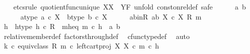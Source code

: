 \begin{isabellebody}
\ \ \isamarkupfalse%
\ {\isacharparenleft}{\kern0pt}etcs{\isacharunderscore}{\kern0pt}rule\ quotient{\isacharunderscore}{\kern0pt}func{\isacharunderscore}{\kern0pt}unique{\isacharbrackleft}{\kern0pt}\ X{\isacharequal}{\kern0pt}X{\isacharcomma}{\kern0pt}\ \ Y{\isacharequal}{\kern0pt}F{\isacharbrackright}{\kern0pt}{\isacharcomma}{\kern0pt}\ unfold\ const{\isacharunderscore}{\kern0pt}on{\isacharunderscore}{\kern0pt}rel{\isacharunderscore}{\kern0pt}def{\isacharcomma}{\kern0pt}\ safe{\isacharparenright}{\kern0pt}\isanewline
\ \ \ \ \isamarkupfalse%
\ a\ b\isanewline
\ \ \ \ \isamarkupfalse%
\ a{\isacharunderscore}{\kern0pt}type{\isacharcolon}{\kern0pt}\ {\isachardoublequoteopen}a\ {\isasymin}\isactrlsub c\ X{\isachardoublequoteclose}\ \ b{\isacharunderscore}{\kern0pt}type{\isacharcolon}{\kern0pt}\ {\isachardoublequoteopen}b\ {\isasymin}\isactrlsub c\ X{\isachardoublequoteclose}\isanewline
\ \ \ \ \isamarkupfalse%
\ ab{\isacharunderscore}{\kern0pt}in{\isacharunderscore}{\kern0pt}R{\isacharcolon}{\kern0pt}\ {\isachardoublequoteopen}{\isasymlangle}a{\isacharcomma}{\kern0pt}b{\isasymrangle}\ {\isasymin}\isactrlbsub X\ {\isasymtimes}\isactrlsub c\ X\isactrlesub \ {\isacharparenleft}{\kern0pt}R{\isacharcomma}{\kern0pt}\ m{\isacharparenright}{\kern0pt}{\isachardoublequoteclose}\isanewline
\ \ \ \ \isamarkupfalse%
\ \isamarkupfalse%
\ h\ \ h{\isacharunderscore}{\kern0pt}type{\isacharcolon}{\kern0pt}\ {\isachardoublequoteopen}h\ {\isasymin}\isactrlsub c\ R{\isachardoublequoteclose}\ \ m{\isacharunderscore}{\kern0pt}h{\isacharunderscore}{\kern0pt}eq{\isacharcolon}{\kern0pt}\ {\isachardoublequoteopen}m\ {\isasymcirc}\isactrlsub c\ h\ {\isacharequal}{\kern0pt}\ {\isasymlangle}a{\isacharcomma}{\kern0pt}\ b{\isasymrangle}{\isachardoublequoteclose}\isanewline
\ \ \ \ \ \ \isamarkupfalse%
\ relative{\isacharunderscore}{\kern0pt}member{\isacharunderscore}{\kern0pt}def\ factors{\isacharunderscore}{\kern0pt}through{\isacharunderscore}{\kern0pt}def\ \isamarkupfalse%
\ cfunc{\isacharunderscore}{\kern0pt}type{\isacharunderscore}{\kern0pt}def\ \isamarkupfalse%
\ auto\ \isanewline
\ \ \ \ \isanewline
\ \ \ \ \isamarkupfalse%
\ {\isachardoublequoteopen}{\isacharparenleft}{\kern0pt}k\ {\isasymcirc}\isactrlsub c\ equiv{\isacharunderscore}{\kern0pt}class\ {\isacharparenleft}{\kern0pt}R{\isacharcomma}{\kern0pt}\ m{\isacharparenright}{\kern0pt}{\isacharparenright}{\kern0pt}\ {\isasymcirc}\isactrlsub c\ left{\isacharunderscore}{\kern0pt}cart{\isacharunderscore}{\kern0pt}proj\ X\ X\ {\isasymcirc}\isactrlsub c\ m\ {\isasymcirc}\isactrlsub c\ h\ {\isacharequal}{\kern0pt}\isanewline

\end{isabellebody}
